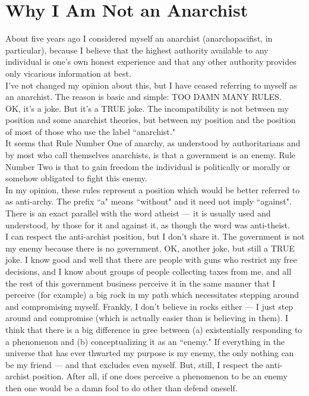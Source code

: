 \chapter{Why I Am Not an Anarchist}

About five years ago I considered myself an anarchist (anarchopacifist, in particular), because I believe that the highest authority available to any individual is one's own honest experience and that any other authority provides only vicarious information at best.\\
I've not changed my opinion about this, but I have ceased referring to myself as an anarchist. The reason is basic and simple: TOO DAMN MANY RULES.\\
OK, it's a joke. But it's a TRUE joke. The incompatibility is not between my position and some anarchist theories, but between my position and the position of most of those who use the label ``anarchist."\\
It seems that Rule Number One of anarchy, as understood by authoritarians and by most who call themselves anarchists, is that a government is an enemy. Rule Number Two is that to gain freedom the individual is politically or morally or somehow obligated to fight this enemy.\\
In my opinion, these rules represent a position which would be better referred to as anti-archy. The prefix ``a" means ``without" and it need not imply ``against". There is an exact parallel with the word atheist --- it is usually used and understood, by those for it and against it, as though the word was anti-theist.\\
I can respect the anti-archist position, but I don't share it. The government is not my enemy because there is no government. OK, another joke, but still a TRUE joke. I know good and well that there are people with guns who restrict my free decisions, and I know about groups of people collecting taxes from me, and all the rest of this government business perceive it in the same manner that I perceive (for example) a big rock in my path which necessitates stepping around and compromising myself. Frankly, I don't believe in rocks either --- I just step around and compromise (which is actually easier than is believing in them). I think that there is a big difference in gree between (a) existentially responding to a phenomenon and (b) conceptualizing it as an ``enemy." If everything in the universe that has ever thwarted my purpose is my enemy, the only nothing can be my friend --- and that excludes even myself. But, still, I respect the anti-archist position. After all, if one does perceive a phenomenon to be an enemy then one would be a damn fool to do other than defend oneself.\\
